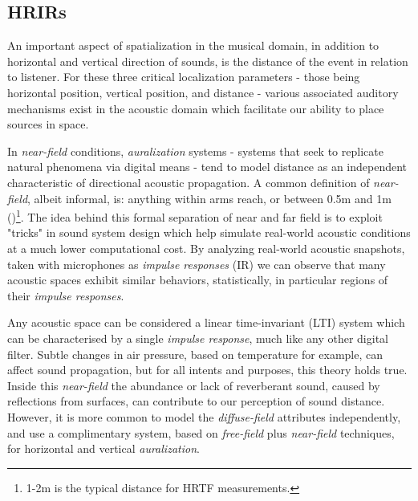 \subsection{HRIRs}\label{subsec:hrirs}

An important aspect of spatialization in the musical domain, in addition to horizontal and vertical direction of sounds, is the distance of the event in relation to listener. For these three critical localization parameters - those being horizontal position, vertical position, and distance - various associated auditory mechanisms exist in the acoustic domain which facilitate our ability to place sources in space. 

In \textit{near-field} conditions, \textit{auralization} systems - systems that seek to replicate natural phenomena via digital means - tend to model distance as an independent characteristic of directional acoustic propagation. A common definition of \textit{near-field}, albeit informal, is: anything within arms reach, or between 0.5m and 1m (\cite{Betbeder.2017})\footnote{1-2m is the typical distance for HRTF measurements.}. The idea behind this formal separation of near and far field is to exploit "tricks" in sound system design which help simulate real-world acoustic conditions at a much lower computational cost. By analyzing real-world acoustic snapshots, taken with microphones as \textit{impulse responses} (IR) we can observe that many acoustic spaces exhibit similar behaviors, statistically, in particular regions of their \textit{impulse responses}. 

Any acoustic space can be considered a linear time-invariant (LTI) system which can be characterised by a single \textit{impulse response}, much like any other digital filter. Subtle changes in air pressure, based on temperature for example, can affect sound propagation, but for all intents and purposes, this theory holds true. Inside this \textit{near-field} the abundance or lack of reverberant sound, caused by reflections from surfaces, can contribute to our perception of sound distance. However, it is more common to model the \textit{diffuse-field} attributes independently, and use a complimentary system, based on \textit{free-field} plus \textit{near-field} techniques, for horizontal and vertical \textit{auralization}.

